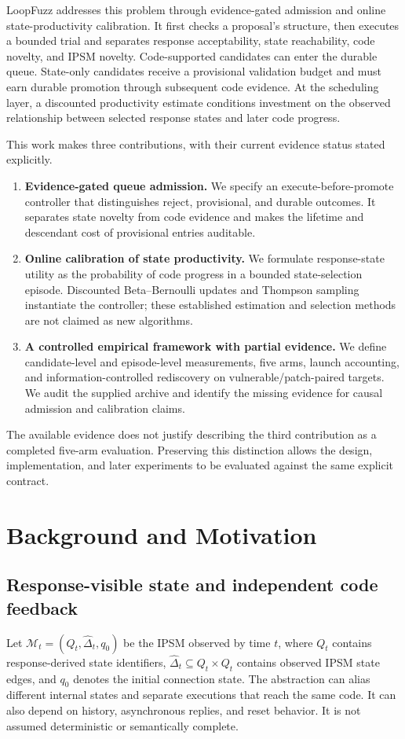 \documentclass[final,5p,times,number]{elsarticle}
\begin{document}
LoopFuzz addresses this problem through evidence-gated admission and online state-productivity calibration. It first checks a proposal's structure, then executes a bounded trial and separates response acceptability, state reachability, code novelty, and IPSM novelty. Code-supported candidates can enter the durable queue. State-only candidates receive a provisional validation budget and must earn durable promotion through subsequent code evidence. At the scheduling layer, a discounted productivity estimate conditions investment on the observed relationship between selected response states and later code progress.

This work makes three contributions, with their current evidence status stated explicitly.
\begin{enumerate}
\item \textbf{Evidence-gated queue admission.} We specify an execute-before-promote controller that distinguishes reject, provisional, and durable outcomes. It separates state novelty from code evidence and makes the lifetime and descendant cost of provisional entries auditable.
\item \textbf{Online calibration of state productivity.} We formulate response-state utility as the probability of code progress in a bounded state-selection episode. Discounted Beta--Bernoulli updates and Thompson sampling instantiate the controller; these established estimation and selection methods are not claimed as new algorithms.
\item \textbf{A controlled empirical framework with partial evidence.} We define candidate-level and episode-level measurements, five arms, launch accounting, and information-controlled rediscovery on vulnerable/patch-paired targets. We audit the supplied archive and identify the missing evidence for causal admission and calibration claims.
\end{enumerate}
The available evidence does not justify describing the third contribution as a completed five-arm evaluation. Preserving this distinction allows the design, implementation, and later experiments to be evaluated against the same explicit contract.

\section{Background and Motivation}
\label{sec:motivation}
\subsection{Response-visible state and independent code feedback}
Let $\mathcal{M}_t=(Q_t,\widehat{\Delta}_t,q_0)$ be the IPSM observed by time $t$, where $Q_t$ contains response-derived state identifiers, $\widehat{\Delta}_t\subseteq Q_t\times Q_t$ contains observed IPSM state edges, and $q_0$ denotes the initial connection state. The abstraction can alias different internal states and separate executions that reach the same code. It can also depend on history, asynchronous replies, and reset behavior. It is not assumed deterministic or semantically complete.
\end{document}
